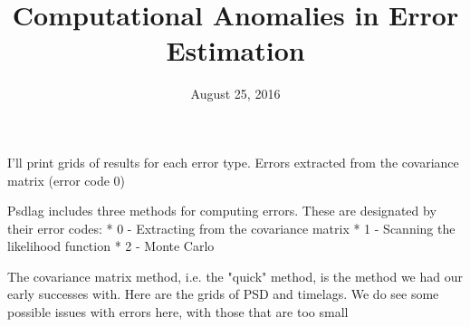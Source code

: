 \documentclass[11pt,letterpaper]{article}
\begin{document}
\title{Computational Anomalies in Error Estimation}

\date{August 25, 2016}

\maketitle

I'll print grids of results for each error type. Errors extracted from the covariance matrix (error code 0)

Psdlag includes three methods for computing errors. These are designated by their error codes:
    * 0 - Extracting from the covariance matrix
    * 1 - Scanning the likelihood function
    * 2 - Monte Carlo

The covariance matrix method, i.e. the "quick" method, is the method we had our early successes with. Here are the grids of PSD and timelags. We do see some possible issues with errors here, with those that are too small 
\end{document}
